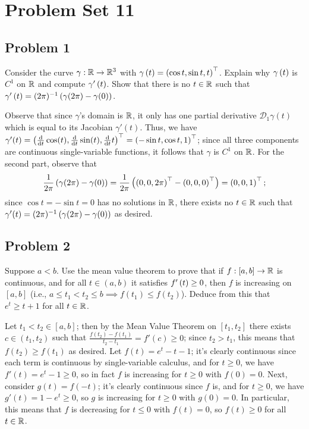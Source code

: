 \documentclass[main.tex]{subfiles}
\begin{document}
\section{Problem Set 11}
\subsection{Problem 1}
\begin{claim}
    Consider the curve $\gamma : \mathbb R\to \mathbb R^3$ with $\gamma \left( t \right) = \left( \cos t,\sin t,t \right)^\top$. Explain why $\gamma \left( t \right)$ is $C^1$ on $\mathbb R$ and compute $\gamma'\left( t \right)$. Show that there is no $t \in \mathbb R$ such that $\gamma'\left( t \right) = (2\pi)^{-1}\left( \gamma (2\pi) -\gamma (0) \right)$.
\end{claim}

\begin{soln}
    Observe that since $\gamma$'s domain is $\mathbb R$, it only has one partial derivative $\mathcal{D}_1\gamma(t)$ which is equal to its Jacobian $\gamma'(t)$. Thus, we have $\gamma'(t) = \left( \frac{\mathrm d}{\mathrm dt}\cos (t), \frac{\mathrm d}{\mathrm dt}\sin (t), \frac{\mathrm d}{\mathrm dt} t \right)^\top = \left( -\sin t, \cos t, 1 \right)^\top$; since all three components are continuous single-variable functions, it follows that $\gamma$ is $C^1$ on $\mathbb R$. For the second part, observe that
    \[\frac{1}{2\pi}\left( \gamma (2\pi) -\gamma (0) \right) = \frac{1}{2\pi}\left( \left( 0, 0, 2\pi \right)^\top - \left( 0, 0, 0 \right)^\top \right) = \left( 0, 0, 1 \right)^\top;\]
    since $\cos t = -\sin t = 0$ has no solutions in $\mathbb R$, there exists no $t\in \mathbb R$ such that $\gamma'(t) = (2\pi)^{-1}\left( \gamma (2\pi) -\gamma (0) \right)$ as desired.
\end{soln}
\eject

\subsection{Problem 2}
\begin{claim}
    Suppose $a < b$. Use the mean value theorem to prove that if $f : [a,b] \to \mathbb R$ is continuous, and for all $t \in  (a,b)$ it satisfies $f'\left( t \right) \ge 0$, then $f$ is increasing on $[a,b]$ (i.e., $a \le  t_1 < t_2 \le  b \implies f(t_1) \le f(t_2)$). Deduce from this that $e^t \ge t + 1$ for all $t \in \mathbb R$.
\end{claim}

\begin{soln}
    Let $t_1 < t_2\in [a, b]$; then by the Mean Value Theorem on $[t_1, t_2]$ there exists $c\in (t_1, t_2)$ such that $\frac{f(t_2) - f(t_1)}{t_2 - t_1} = f'(c) \ge 0$; since $t_2 > t_1$, this means that $f(t_2) \ge f(t_1)$ as desired. Let $f(t) = e^t - t - 1$; it's clearly continuous since each term is continuous by single-variable calculus, and for $t \ge 0$, we have $f'(t) = e^t - 1\ge 0$, so in fact $f$ is increasing for $t \ge 0$ with $f(0) = 0$. Next, consider $g(t) = f(-t)$; it's clearly continuous since $f$ is, and for $t \ge 0$, we have $g'(t) = 1 - e^t \ge 0$, so $g$ is increasing for $t \ge 0$ with $g(0) = 0$. In particular, this means that $f$ is decreasing for $t \le 0$ with $f(t) = 0$, so $f(t) \ge 0$ for all $t\in \mathbb R$.
\end{soln}
\eject
\end{document}
